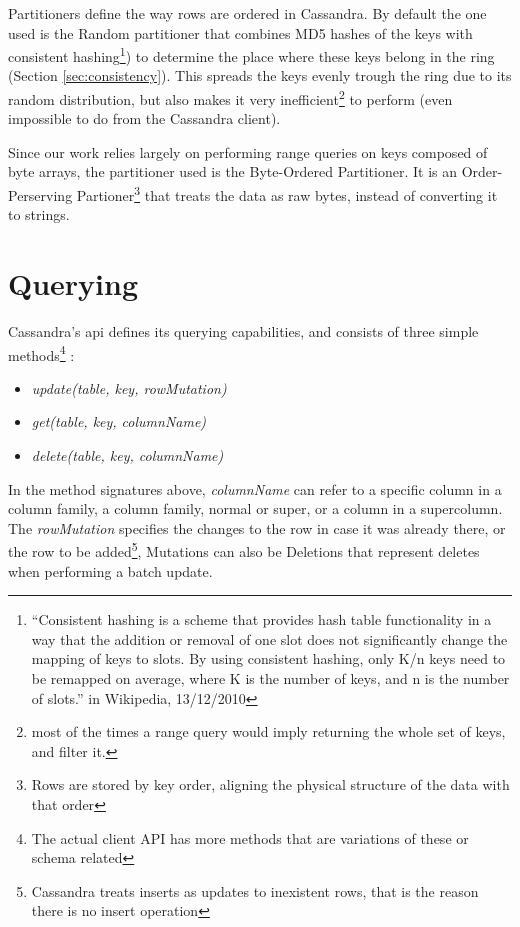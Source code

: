 Partitioners define the way rows are ordered in Cassandra. By default the one used is the Random partitioner that combines MD5 hashes of the keys with consistent hashing\footnote{``Consistent hashing is a scheme that provides hash table functionality in a way that the addition or removal of one slot does not significantly change the mapping of keys to slots. By using consistent hashing, only K/n keys need to be remapped on average, where K is the number of keys, and n is the number of slots.'' in Wikipedia, 13/12/2010}) to determine the place where these keys belong in the ring (Section \ref{sec:consistency}). This spreads the keys evenly trough the ring due to its random distribution, but also makes it very inefficient\footnote{most of the times a range query would imply returning the whole set of keys, and filter it.} to perform (even impossible to do from the Cassandra client). 

Since our work relies largely on performing range queries on keys composed of byte arrays, the partitioner used is the Byte-Ordered Partitioner. It is an Order-Perserving Partioner\footnote{Rows are stored by key order, aligning the physical structure of the data with that order} that treats the data as raw bytes, instead of converting it to strings.    


\section{Querying}
Cassandra's \ac{api} defines its querying capabilities, and consists of three simple methods\footnote{The actual client API has more methods that are variations of these or schema related} \cite{lakshmanMalik}:

\begin{itemize}
	\item \emph{update(table, key, rowMutation)}
	\item \emph{get(table, key, columnName)}
	\item \emph{delete(table, key, columnName)}
\end{itemize}	

In the method signatures above, \emph{columnName} can refer to a specific column in a column family, a column family, normal or super, or a column in a supercolumn. The \emph{rowMutation} specifies the changes to the row in case it was already there, or the row to be added\footnote{Cassandra treats inserts as updates to inexistent rows, that is the reason there is no insert operation}, Mutations can also be Deletions that represent deletes when performing a batch update.

